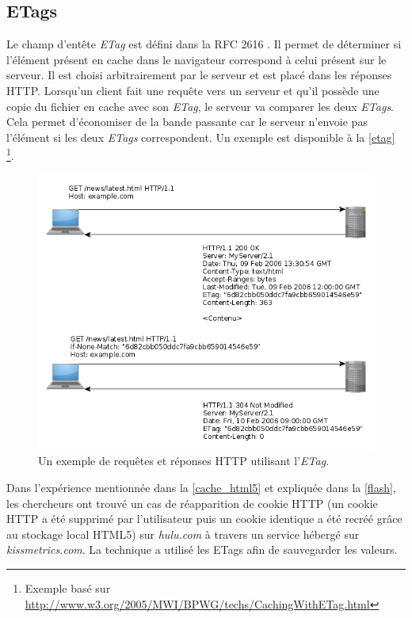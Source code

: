 \subsection{ETags}
\label{cache_etags}
Le champ d'entête \textit{ETag} est défini dans la RFC 2616 \cite{IETF_RFC2616}. Il permet de déterminer si l'élément présent en cache dans le navigateur correspond à celui présent sur le serveur. Il est choisi arbitrairement par le serveur et est placé dans les réponses HTTP. Lorsqu'un client fait une requête vers un serveur et qu'il possède une copie du fichier en cache avec son \textit{ETag}, le serveur va comparer les deux \textit{ETags}. Cela permet d'économiser de la bande passante car le serveur n'envoie pas l'élément si les deux \textit{ETags} correspondent. Un exemple est disponible à la \autoref{etag} \footnote{Exemple basé sur \url{http://www.w3.org/2005/MWI/BPWG/techs/CachingWithETag.html}}.
\begin{figure}[h]
	\centering
	\includegraphics[scale=0.6]{figures/ETag.png}
	\caption{\label{etag}Un exemple de requêtes et réponses HTTP utilisant l'\textit{ETag}.}
\end{figure}
\newline

Dans l'expérience mentionnée dans la \autoref{cache_html5} et expliquée dans la \autoref{flash}, les chercheurs ont trouvé un cas de réapparition de cookie HTTP (un cookie HTTP a été supprimé par l'utilisateur puis un cookie identique a été recréé grâce au stockage local HTML5) sur \textit{hulu.com} à travers un service hébergé sur \textit{kissmetrics.com}. La technique a utilisé les ETags afin de sauvegarder les valeurs.
\newline

